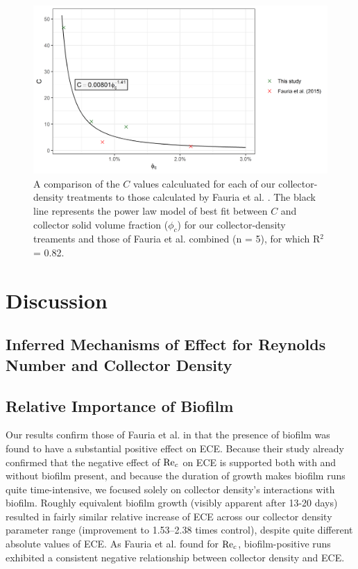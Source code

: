 \documentclass[geosciences,article,submit,moreauthors,pdftex]{Definitions/mdpi}
\begin{document}
\begin{figure}[H]
\centering
\includegraphics[width=5in]{../pics/cphiplot.png}
\caption{A comparison of the $C$ values calculuated for each of our collector-density treatments to those calculated by Fauria et al. \cite{Fauria_2015}. The black line represents the power law model of best fit between $C$ and collector solid volume fraction ($\phi_c$) for our collector-density treaments and those of Fauria et al. combined (n = 5), for which R$^2$ = 0.82.}
\label{fig:cphi}
\end{figure}   

\section{Discussion}

\subsection{Inferred Mechanisms of Effect for Reynolds Number and Collector Density}



\subsection{Relative Importance of Biofilm}

Our results confirm those of Fauria et al. \cite{Fauria_2015} in that the presence of biofilm was found to have a substantial positive effect on ECE. Because their study already confirmed that the negative effect of $\mathrm{Re}_c$ on ECE is supported both with and without biofilm present, and because the duration of growth makes biofilm runs quite time-intensive, we focused solely on collector density's interactions with biofilm. Roughly equivalent biofilm growth (visibly apparent after 13-20 days) resulted in fairly similar relative increase of ECE across our collector density parameter range (improvement to 1.53--2.38 times control), despite quite different absolute values of ECE. As Fauria et al. \cite{Fauria_2015} found for $\mathrm{Re}_c$, biofilm-positive runs exhibited a consistent negative relationship between collector density and ECE.
\end{document}
